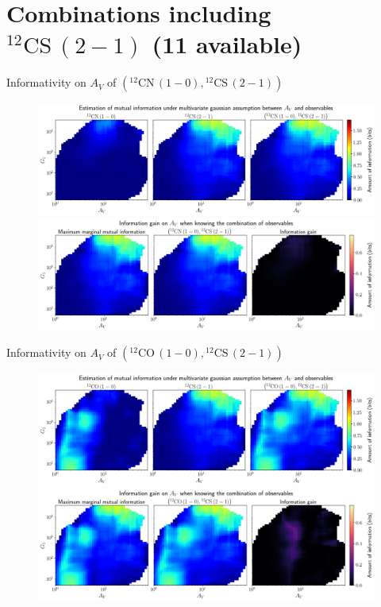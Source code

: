 \documentclass{beamer}
\begin{document}
\section{Combinations including $\mathrm{^{12}CS\,(2-1)}$ (11 available)}

\begin{frame}{Informativity on $A_V$ of $\left(\mathrm{^{12}CN\,(1-0)},\mathrm{^{12}CS\,(2-1)}\right)$}
    \begin{figure}
        \centering
        \includegraphics[width=0.95\linewidth]{../linearinfogauss/av__12cn10_12cs21_linearinfogauss.png}
        \vfill
        \includegraphics[width=0.95\linewidth]{../linearinfogauss/av__12cn10_12cs21_linearinfogauss_gain.png}
    \end{figure}
\end{frame}

\begin{frame}{Informativity on $A_V$ of $\left(\mathrm{^{12}CO\,(1-0)},\mathrm{^{12}CS\,(2-1)}\right)$}
    \begin{figure}
        \centering
        \includegraphics[width=0.95\linewidth]{../linearinfogauss/av__12co10_12cs21_linearinfogauss.png}
        \vfill
        \includegraphics[width=0.95\linewidth]{../linearinfogauss/av__12co10_12cs21_linearinfogauss_gain.png}
    \end{figure}
\end{frame}
\end{document}
